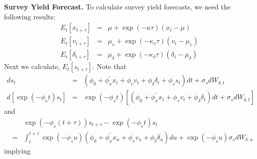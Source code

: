 \documentclass{article}
\begin{document}
\textbf{Survey Yield Forecast.} To calculate survey yield forecasts, we need
the following results: 
\begin{eqnarray*}
E_{t}\left[ x_{t+\tau }\right] &=&\mu +\exp \left( -\kappa \tau \right)
\left( x_{t}-\mu \right) \\
E_{t}\left[ v_{t+\tau }\right] &=&\mu _{v}+\exp \left( -\kappa _{v}\tau
\right) \left( v_{t}-\mu _{v}\right) \\
E_{t}\left[ \delta _{t+\tau }\right] &=&\mu _{\delta }+\exp \left( -\kappa
_{\delta }\tau \right) \left( \delta _{t}-\mu _{\delta }\right)
\end{eqnarray*}%
Next we calculate, $E_{t}\left[ s_{t+\tau }\right] $. Note that 
\begin{eqnarray*}
ds_{t} &=&\left( \phi _{0}+\phi _{x}^{\prime }x_{t}+\phi _{v}v_{t}+\phi
_{\delta }\delta _{t}+\phi _{s}s_{t}\right) dt+\sigma _{s}dW_{\delta ,t} \\
d\left[ \exp \left( -\phi _{s}t\right) s_{t}\right] &=&\exp \left( -\phi
_{s}t\right) \left[ \left( \phi _{0}+\phi _{x}^{\prime }x_{t}+\phi
_{v}v_{t}+\phi _{\delta }\delta _{t}\right) dt+\sigma _{s}dW_{\delta ,t}%
\right]
\end{eqnarray*}%
and%
\begin{eqnarray*}
&&\exp \left( -\phi _{s}\left( t+\tau \right) \right) s_{t+\tau }-\exp
\left( -\phi _{s}t\right) s_{t} \\
&=&\int_{t}^{t+\tau }\exp \left( -\phi _{s}u\right) \left( \phi _{0}+\phi
_{x}^{\prime }x_{u}+\phi _{v}v_{u}+\phi _{\delta }\delta _{u}\right) du+\exp
\left( -\phi _{s}u\right) \sigma _{s}dW_{\delta ,u}
\end{eqnarray*}%
implying%
\end{document}
